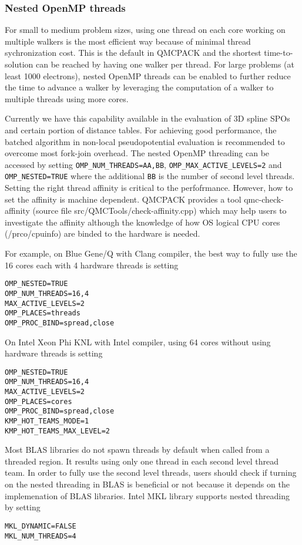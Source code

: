 \subsubsection{Nested OpenMP threads}
For small to medium problem sizes, using one thread on each core working on multiple walkers is the most efficient way because of minimal thread sychronization cost.
This is the default in QMCPACK and the shortest time-to-solution can be reached by having one walker per thread.
For large problems (at least 1000 electrons), nested OpenMP threads can be enabled to further reduce the time to advance a walker
by leveraging the computation of a walker to multiple threads using more cores.

Currently we have this capability available in the evaluation of 3D spline SPOs and certain portion of distance tables.
For achieving good performance, the batched algorithm in non-local pseudopotential evaluation is recommended to overcome most fork-join overhead.
The nested OpenMP threading can be accessed by setting \texttt{OMP\_NUM\_THREADS=AA,BB}, \texttt{OMP\_MAX\_ACTIVE\_LEVELS=2} and \texttt{OMP\_NESTED=TRUE}
where the additional \texttt{BB} is the number of second level threads.
Setting the right thread affinity is critical to the perfofrmance. However, how to set the affinity is machine dependent.
QMCPACK provides a tool qmc-check-affinity (source file src/QMCTools/check-affinity.cpp) which may help users to investigate the affinity
although the knowledge of how OS logical CPU cores (/prco/cpuinfo) are binded to the hardware is needed.

For example, on Blue Gene/Q with Clang compiler, the best way to fully use the 16 cores each with 4 hardware threads is setting
\begin{verbatim}
OMP_NESTED=TRUE
OMP_NUM_THREADS=16,4
MAX_ACTIVE_LEVELS=2
OMP_PLACES=threads
OMP_PROC_BIND=spread,close
\end{verbatim}

On Intel Xeon Phi KNL with Intel compiler, using 64 cores without using hardware threads is setting
\begin{verbatim}
OMP_NESTED=TRUE
OMP_NUM_THREADS=16,4
MAX_ACTIVE_LEVELS=2
OMP_PLACES=cores
OMP_PROC_BIND=spread,close
KMP_HOT_TEAMS_MODE=1
KMP_HOT_TEAMS_MAX_LEVEL=2
\end{verbatim}

Most BLAS libraries do not spawn threads by default when called from a threaded region.
It results using only one thread in each second level thread team. In order to fully use the second level threads,
users should check if turning on the nested threading in BLAS is beneficial or not
because it depends on the implemenation of BLAS libraries.
Intel MKL library supports nested threading by setting
\begin{verbatim}
MKL_DYNAMIC=FALSE
MKL_NUM_THREADS=4
\end{verbatim}

